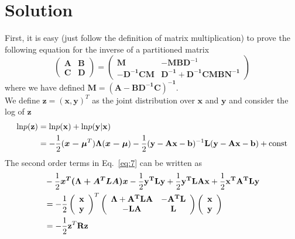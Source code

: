 \documentclass{article}
\begin{document}
    \section{Solution}
    First, it is easy (just follow the definition of matrix multiplication) to prove the following equation for the inverse of a partitioned matrix
    \begin{equation}
    \left(\begin{array}{cc}
    \mathbf{A} & \mathbf{B}\\
    \mathbf{C} & \mathbf{D}
    \end{array}\right) =\left(\begin{array}{cc}
    \mathbf{M} & \mathbf{-MBD}^{-1}\\
    \mathbf{-D^{-1}CM} & \mathbf{D^{-1}+D^{-1}CMBN^{-1}}\end{array}\right)\label{eq:6}
    \end{equation} 
    where we have defined $\mathbf{M=(A-BD^{-1}C)^{-1}}$.\\
    We define $\mathbf{z=(x,y)}^T$ as the joint distribution over $\mathbf{x}$ and $\mathbf{y}$ and consider the log of $\mathbf{z}$
    \begin{align}
    \text{ln}p(\mathbf{z})&=\text{ln}p(\mathbf{x})+\text{ln}p(\mathbf{y|x})\notag\\
    &=-\frac{1}{2}(\boldsymbol{x-\mu}^T)\boldsymbol{\Lambda}(\boldsymbol{x-\mu})-\frac{1}{2}(\mathbf{y-Ax-b})^{-1}\mathbf{L}(\mathbf{y-Ax-b})+\text{const}\label{eq:7}
    \end{align}
    The second order terms in Eq.~{\ref{eq:7}} can be written as
    \begin{align}
    &-\frac{1}{2}\boldsymbol{x^T(\Lambda+A^TLA)x} - \frac{1}{2}\mathbf{y^TLy}+\frac{1}{2}\mathbf{y^TLAx}+\frac{1}{2}\mathbf{x^TA^TLy}\notag\\
    &= -\frac{1}{2}\left(\begin{array}{c}
    \mathbf{x}\\
    \mathbf{y}\end{array}\right)^T\left(\begin{array}{cc}
    \boldsymbol{\Lambda}+\mathbf{A^TLA} & -\mathbf{A^TL}\\
    -\mathbf{LA} & \mathbf{L}\end{array}\right)\left(\begin{array}{c}
    \mathbf{x}\\
    \mathbf{y}\end{array}\right)\notag\\
    & = -\frac{1}{2}\mathbf{z}^T\mathbf{Rz}
    \end{align}
\end{document}
